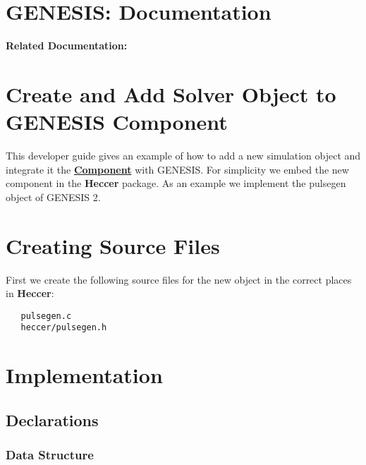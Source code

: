 \documentclass[12pt]{article}
\begin{document}
\section*{GENESIS: Documentation}

{\bf Related Documentation:}

\section*{Create and Add Solver Object to GENESIS Component}

This developer guide gives an example of how to add a new simulation
object and integrate it the
\href{../reserved-words/reserved-words.tex}{\bf Component} with
GENESIS.  For simplicity we embed the new component in the {\bf
  Heccer} package.  As an example we implement the pulsegen object of
GENESIS 2.

\section*{Creating Source Files}

First we create the following source files for the new object in the correct places in {\bf Heccer}:
\begin{verbatim}
   pulsegen.c
   heccer/pulsegen.h
\end{verbatim}

\section*{Implementation}

\subsection*{Declarations}

\subsubsection*{Data Structure}
\end{document}
